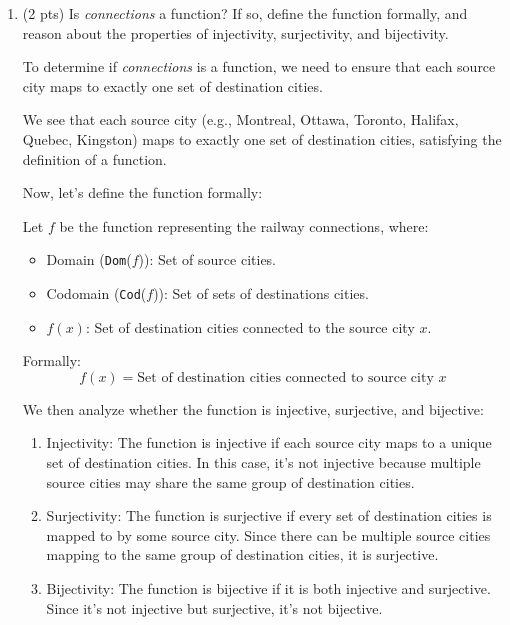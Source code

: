 \documentclass[12pt]{article}
\begin{document}
\begin{spacing}{1.5}
\begin{enumerate}
		\item (2 pts) Is \textit{connections} a function? If so, define the function formally, and reason about the properties of injectivity, surjectivity, and bijectivity.
		      
		      To determine if \textit{connections} is a function, we need to ensure that each source city maps to exactly one set of destination cities.
		      
		      We see that each source city (e.g., Montreal, Ottawa, Toronto, Halifax, Quebec, Kingston) maps to exactly one set of destination cities, satisfying the definition of a function.
		      
		      Now, let's define the function formally:
		      
		      Let $f$ be the function representing the railway connections, where:
		      
		      \begin{itemize}
		      	\item Domain (\texttt{Dom}($f$)): Set of source cities.
		      	\item Codomain (\texttt{Cod}($f$)): Set of sets of destinations cities.
		      	\item $f(x)$: Set of destination cities connected to the source city $x$.
		      \end{itemize}
		      
		      Formally:
		      $$f(x)=\text{Set of destination cities connected to source city }x$$
		      
		      We then analyze whether the function is injective, surjective, and bijective:
		      
		      \begin{enumerate}
		      	\item Injectivity: The function is injective if each source city maps to a unique set of destination cities. In this case, it's not injective because multiple source cities may share the same group of destination cities.
		      	\item Surjectivity: The function is surjective if every set of destination cities is mapped to by some source city. Since there can be multiple source cities mapping to the same group of destination cities, it is surjective.
		      	\item Bijectivity: The function is bijective if it is both injective and surjective. Since it's not injective but surjective, it's not bijective.
		      \end{enumerate}
		      

\end{enumerate}
\end{spacing}
\end{document}
